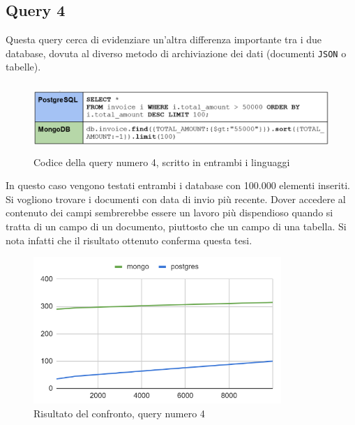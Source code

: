
\subsection{Query 4}
Questa query cerca di evidenziare un'altra differenza importante tra i due database, dovuta al diverso metodo di archiviazione dei dati (documenti \texttt{JSON} o tabelle).\\

\begin{figure}[htbp]
\begin{center}
\includegraphics[height=7em]{immagini/query/query4.png}
\caption{Codice della query numero 4, scritto in entrambi i linguaggi}
\end{center}
\end{figure}

\noindent In questo caso vengono testati entrambi i database con 100.000 elementi inseriti.\\
Si vogliono trovare i documenti con data di invio più recente. Dover accedere al contenuto dei campi sembrerebbe essere un lavoro più dispendioso quando si tratta di un campo di un documento, piuttosto che un campo di una tabella. Si nota infatti che il risultato ottenuto conferma questa tesi.\\

\begin{figure}[htbp]
\begin{center}
\includegraphics[height=15em]{immagini/query/query4_results.png}
\caption{Risultato del confronto, query numero 4}
\end{center}
\end{figure}

